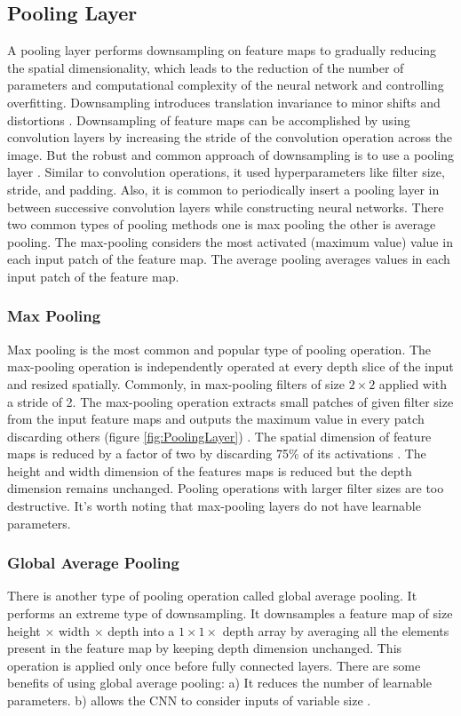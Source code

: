 \subsection{Pooling Layer}\label{PoolingLayer}
A pooling layer performs downsampling on feature maps to gradually reducing the spatial dimensionality, which leads to the reduction of the number of parameters and computational complexity of the neural network and controlling overfitting. Downsampling introduces translation invariance to minor shifts and distortions \cite{goodfellow2017deep}. Downsampling of feature maps can be accomplished by using convolution layers by increasing the stride of the convolution operation across the image. But the robust and common approach of downsampling is to use a pooling layer \cite{goodfellow2017deep}. Similar to convolution operations, it used hyperparameters like filter size, stride, and padding. Also, it is common to periodically insert a pooling layer in between successive convolution layers while constructing neural networks. There two common types of pooling methods one is max pooling the other is average pooling. The max-pooling considers the most activated (maximum value) value in each input patch of the feature map. The average pooling averages values in each input patch of the feature map.

\subsubsection{Max Pooling}
Max pooling is the most common and popular type of pooling operation. The max-pooling operation is independently operated at every depth slice of the input and resized spatially. Commonly, in max-pooling filters of size $2 \times 2$ applied with a stride of 2. The max-pooling operation extracts small patches of given filter size from the input feature maps and outputs the maximum value in every patch discarding others (figure \ref{fig:PoolingLayer}) \cite{goodfellow2017deep}. The spatial dimension of feature maps is reduced by a factor of two by discarding 75\% of its activations \cite{kumar2018ordinal}. The height and width dimension of the features maps is reduced but the depth dimension remains unchanged. Pooling operations with larger filter sizes are too destructive. It's worth noting that max-pooling layers do not have learnable parameters.

\subsubsection{Global Average Pooling}
There is another type of pooling operation called global average pooling. It performs an extreme type of downsampling. It downsamples a feature map of size height $\times$ width $\times$ depth into a $1 \times 1 \times$ depth array by averaging all the elements present in the feature map by keeping depth dimension unchanged. This operation is applied only once before fully connected layers. There are some benefits of using global average pooling: a)  It reduces the number of learnable parameters. b) allows the CNN to consider inputs of variable size \cite{articleCNNs} \cite{lin2014network}.



